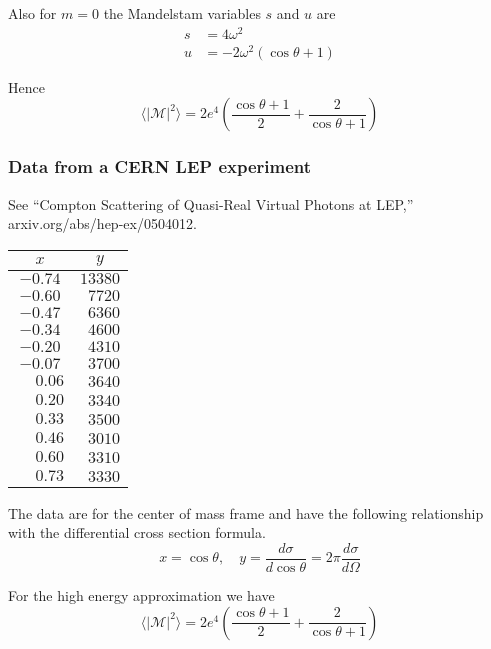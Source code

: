 Also for $m=0$ the Mandelstam variables $s$ and $u$ are
\begin{align*}
s&=4\omega^2
\\
u&=-2\omega^2(\cos\theta+1)
\end{align*}

Hence
\begin{equation*}
\langle|\mathcal{M}|^2\rangle
=2e^4\left(
\frac{\cos\theta+1}{2}+\frac{2}{\cos\theta+1}
\right)
\end{equation*}

\iffalse

\subsubsection*{Data from a CERN LEP experiment}
See ``Compton Scattering of Quasi-Real Virtual Photons at LEP,''
arxiv.org/abs/hep-ex/0504012.

\begin{center}
\begin{tabular}{|c|c|}
\hline
$x$ & $y$\\
\hline
$-0.74$ & $13380$\\
$-0.60$ & $\phantom{0}7720$\\
$-0.47$ & $\phantom{0}6360$\\
$-0.34$ & $\phantom{0}4600$\\
$-0.20$ & $\phantom{0}4310$\\
$-0.07$ & $\phantom{0}3700$\\
$\phantom{+}0.06$ & $\phantom{0}3640$\\
$\phantom{+}0.20$ & $\phantom{0}3340$\\
$\phantom{+}0.33$ & $\phantom{0}3500$\\
$\phantom{+}0.46$ & $\phantom{0}3010$\\
$\phantom{+}0.60$ & $\phantom{0}3310$\\
$\phantom{+}0.73$ & $\phantom{0}3330$\\
\hline
\end{tabular}
\end{center}

The data are for the center of mass frame and have the following relationship with the differential cross section formula.
\begin{equation*}
x=\cos\theta,
\quad
y=\frac{d\sigma}{d\cos\theta}=2\pi\frac{d\sigma}{d\Omega}
\end{equation*}

For the high energy approximation we have
\begin{equation*}
\langle|\mathcal{M}|^2\rangle
=
2e^4\left(
\frac{\cos\theta+1}{2}+\frac{2}{\cos\theta+1}
\right)
\end{equation*}

